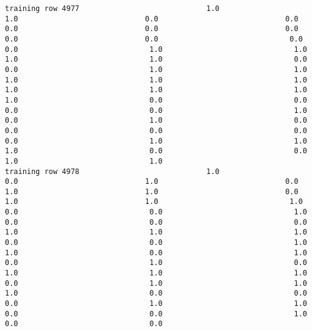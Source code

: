 \documentclass[11pt]{article}
\begin{document}
\begin{verbatim}
training row 4977                             1.0                             1.0                             0.0                             0.0                             0.0                             0.0                             0.0                             0.0                             0.0                              0.0                              0.0                              1.0                              1.0                              1.0                              1.0                              0.0                              0.0                              1.0                              1.0                              1.0                              1.0                              1.0                              1.0                              1.0                              1.0                              1.0                              0.0                              0.0                              0.0                              0.0                              1.0                              0.0                              1.0                              0.0                              0.0                              0.0                              0.0                              0.0                              1.0                              1.0                              1.0                              0.0                              0.0                              1.0                              1.0
training row 4978                             1.0                             0.0                             1.0                             0.0                             1.0                             1.0                             0.0                             1.0                             1.0                              1.0                              0.0                              0.0                              1.0                              0.0                              0.0                              0.0                              1.0                              1.0                              1.0                              0.0                              0.0                              1.0                              1.0                              0.0                              1.0                              0.0                              1.0                              0.0                              1.0                              1.0                              1.0                              0.0                              1.0                              1.0                              1.0                              0.0                              0.0                              0.0                              1.0                              1.0                              0.0                              0.0                              1.0                              0.0                              0.0

\end{verbatim}
\end{document}
